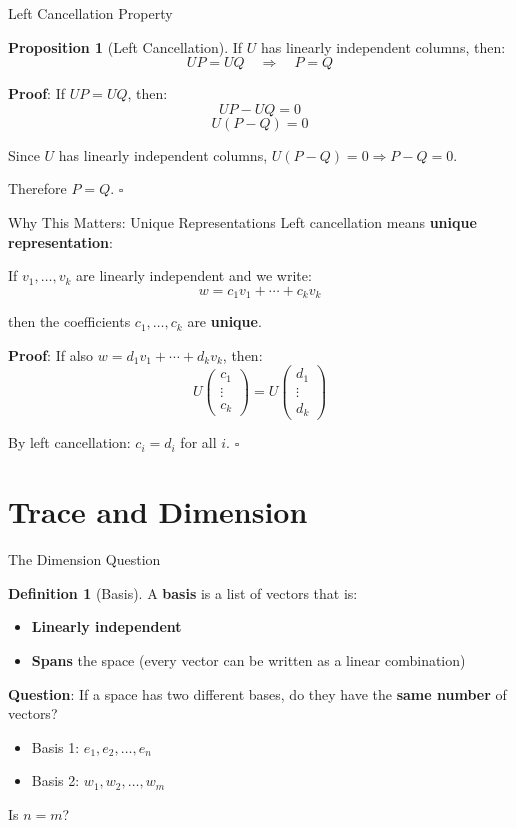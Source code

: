 \documentclass[10pt]{beamer}
\theoremstyle{definition}
\newtheorem{defi}{Definition}[section]
\newtheorem{prop}{Proposition}[section]
\newcommand{\x}[1]{\alert{\textbf{#1}}}
\begin{document}
\begin{frame}{Left Cancellation Property}
\begin{prop}[Left Cancellation]
If $U$ has linearly independent columns, then:
$$UP = UQ \quad \Rightarrow \quad P = Q$$
\end{prop}

\vfill
\textbf{Proof}: If $UP = UQ$, then:
$$UP - UQ = 0$$
$$U(P - Q) = 0$$

Since $U$ has linearly independent columns, $U(P-Q) = 0 \Rightarrow P - Q = 0$.

Therefore $P = Q$. $\square$
\end{frame}

\begin{frame}{Why This Matters: Unique Representations}
Left cancellation means \x{unique representation}:

\vfill
If $v_1, \ldots, v_k$ are linearly independent and we write:
$$w = c_1 v_1 + \cdots + c_k v_k$$

then the coefficients $c_1, \ldots, c_k$ are \x{unique}.

\vfill
\x{Proof}: If also $w = d_1 v_1 + \cdots + d_k v_k$, then:
$$U \begin{pmatrix} c_1 \\ \vdots \\ c_k \end{pmatrix} = U \begin{pmatrix} d_1 \\ \vdots \\ d_k \end{pmatrix}$$

By left cancellation: $c_i = d_i$ for all $i$. $\square$
\end{frame}

\section{Trace and Dimension}

\begin{frame}{The Dimension Question}
\begin{defi}[Basis]
A \x{basis} is a list of vectors that is:
\begin{itemize}
\item \x{Linearly independent}
\item \x{Spans} the space (every vector can be written as a linear combination)
\end{itemize}
\end{defi}

\vfill
\x{Question}: If a space has two different bases, do they have the \x{same number} of vectors?

\vfill
\begin{itemize}
\item Basis 1: $e_1, e_2, \ldots, e_n$
\item Basis 2: $w_1, w_2, \ldots, w_m$
\end{itemize}

Is $n = m$?
\end{frame}
\end{document}
